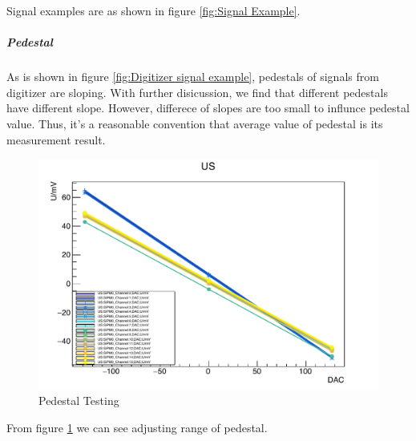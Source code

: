 \documentclass[11pt,a4paper]{article}
\begin{document}
\begin{figure}
{            }


    \end{figure}
    Signal examples are as shown in figure \ref{fig:Signal Example}.

    \subparagraph{Pedestal}As is shown in figure \ref{fig:Digitizer signal example}, pedestals of signals from digitizer are sloping.
    With further disicussion, we find that different pedestals have different slope.
    However, differece of slopes are too small to influnce pedestal value.
    Thus, it's a reasonable convention that average value of pedestal is its measurement result.

    \begin{figure}[ht]

        \includegraphics[scale=0.5]{fig/Pedestal.pdf}
        \caption{Pedestal Testing}\label{fig:Pedestal Testing}
    \end{figure}


    From figure \ref{fig:Pedestal Testing} we can see adjusting range of pedestal.
\end{document}
